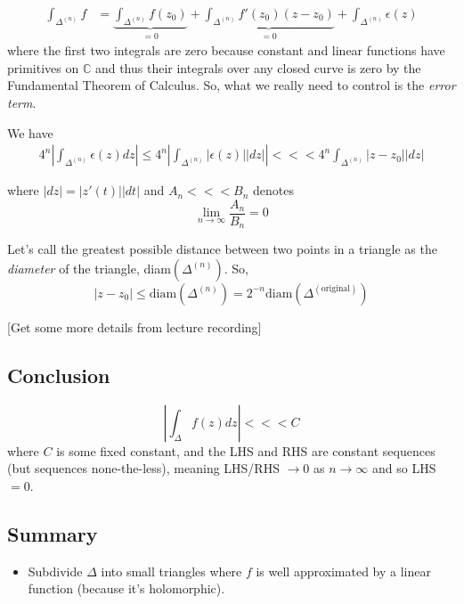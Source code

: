 \documentclass{article}
\newcommand{\C}{\mathbb{C}}
\begin{document}
\begin{itemize}
\begin{align*}
  \int_{\Delta^{(n)}} f &= \underbrace{\int_{\Delta^{(n)}} f(z_0)}_{=0} + \underbrace{\int_{\Delta^{(n)}}  f'(z_0)(z - z_0)}_{=0} + \int_{\Delta^{(n)}}  \epsilon(z) 
\end{align*}
where the first two integrals are zero because constant and linear functions have primitives on $\C$ and thus their integrals over any closed curve is zero by the Fundamental Theorem of Calculus. So, what we really need to control is the \emph{error term}.

\vskip 0.5cm
We have 
\begin{align*}
  4^n \left| \int_{\Delta^{(n)}} \epsilon(z) dz \right| \leq 4^n \left| \int_{\Delta^{(n)}} \left|\epsilon(z)\right| \left|dz\right|  \right| <<< 4^n \int_{\Delta^{(n)}}  \left| z - z_0 \right| \left| dz \right|
\end{align*}

where $\left|dz\right| = \left|z'(t)\right| \left|dt\right|$ and  $A_n <<< B_n$ denotes 
\[ \lim_{n \rightarrow \infty} \frac{A_n}{B_n} = 0 \]

Let's call the greatest possible distance between two points in a triangle as the \emph{diameter} of the triangle, diam$(\Delta^{(n)})$. So, 
\[ \left| z - z_0 \right| \leq \text{diam}(\Delta^{(n)}) = 2^{-n}\text{diam}(\Delta^{(\text{original})}) \]

[Get some more details from lecture recording]

\vskip 0.5cm
\subsection*{Conclusion}

\[ \left| \int_{\Delta} f(z)dz \right| <<< C \]
where $C$ is some fixed constant, and the LHS and RHS are constant sequences (but sequences none-the-less), meaning LHS/RHS $\rightarrow 0$ as $n \rightarrow \infty$ and so LHS $ = 0$.

\end{itemize}

\subsection*{Summary}
\begin{itemize}
  \item Subdivide $\Delta$ into small triangles where $f$ is well approximated by a linear function (because it's holomorphic).
\end{itemize}
\end{document}
